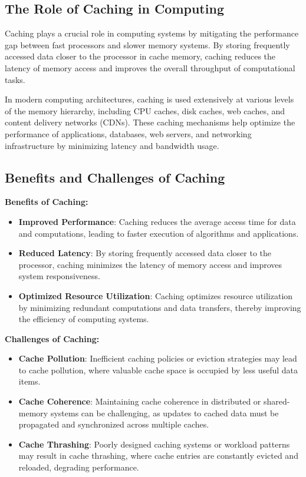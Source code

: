 \documentclass[12pt]{book} %
\begin{document}
\subsection{The Role of Caching in Computing}

Caching plays a crucial role in computing systems by mitigating the performance gap between fast processors and slower memory systems. By storing frequently accessed data closer to the processor in cache memory, caching reduces the latency of memory access and improves the overall throughput of computational tasks.

In modern computing architectures, caching is used extensively at various levels of the memory hierarchy, including CPU caches, disk caches, web caches, and content delivery networks (CDNs). These caching mechanisms help optimize the performance of applications, databases, web servers, and networking infrastructure by minimizing latency and bandwidth usage.

\subsection{Benefits and Challenges of Caching}

\textbf{Benefits of Caching:}
\begin{itemize}
    \item \textbf{Improved Performance}: Caching reduces the average access time for data and computations, leading to faster execution of algorithms and applications.
    \item \textbf{Reduced Latency}: By storing frequently accessed data closer to the processor, caching minimizes the latency of memory access and improves system responsiveness.
    \item \textbf{Optimized Resource Utilization}: Caching optimizes resource utilization by minimizing redundant computations and data transfers, thereby improving the efficiency of computing systems.
\end{itemize}

\textbf{Challenges of Caching:}
\begin{itemize}
    \item \textbf{Cache Pollution}: Inefficient caching policies or eviction strategies may lead to cache pollution, where valuable cache space is occupied by less useful data items.
    \item \textbf{Cache Coherence}: Maintaining cache coherence in distributed or shared-memory systems can be challenging, as updates to cached data must be propagated and synchronized across multiple caches.
    \item \textbf{Cache Thrashing}: Poorly designed caching systems or workload patterns may result in cache thrashing, where cache entries are constantly evicted and reloaded, degrading performance.
\end{itemize}
\end{document}
